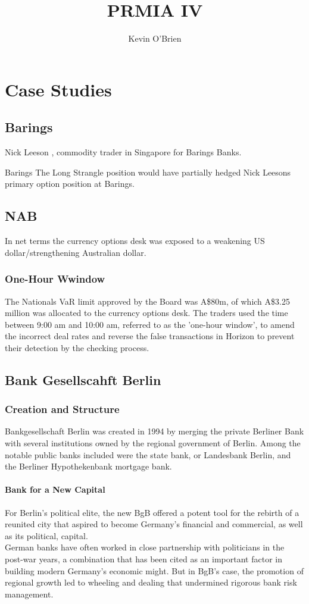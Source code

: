 \documentclass[12pt, a4paper]{report}
\begin{document}
\author{Kevin O'Brien}
\title{PRMIA IV}

\tableofcontents \setcounter{tocdepth}{2}

\newpage
\chapter{Case Studies}
\section{Barings}
Nick Leeson , commodity trader in Singapore for Barings Banks.

Barings The Long Strangle position would have partially hedged
Nick Leesons primary option position at Barings.
\section{NAB}
In net terms the currency options desk was exposed to a weakening
US dollar/strengthening Australian dollar.

\subsection{One-Hour Wwindow } The Nationals VaR limit approved by
the Board was A\$80m, of which A\$3.25 million was allocated to
the currency options desk. The traders used the time between 9:00
am and 10:00 am, referred to as the 'one-hour window', to amend
the incorrect deal rates and reverse the false transactions in
Horizon to prevent their detection by the checking process.

\section{Bank Gesellscahft Berlin}
\subsection{Creation and Structure}
Bankgesellschaft Berlin was created in 1994 by merging the private
Berliner Bank with several institutions owned by the regional
government of Berlin. Among the notable public banks included were
the state bank, or Landesbank Berlin, and the Berliner
Hypothekenbank mortgage bank.
\subsubsection{Bank for a New Capital}
For Berlin's political elite, the new BgB offered a potent tool
for the rebirth of a reunited city that aspired to become
Germany's financial and commercial, as well as its political,
capital. \\ German banks have often worked in close partnership
with politicians in the post-war years, a combination that has
been cited as an important factor in building modern Germany's
economic might. But in BgB's case, the promotion of regional
growth led to wheeling and dealing that undermined rigorous bank
risk management.
\end{document}

